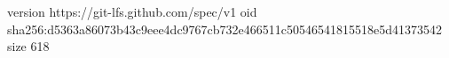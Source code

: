 version https://git-lfs.github.com/spec/v1
oid sha256:d5363a86073b43c9eee4dc9767cb732e466511c50546541815518e5d41373542
size 618
